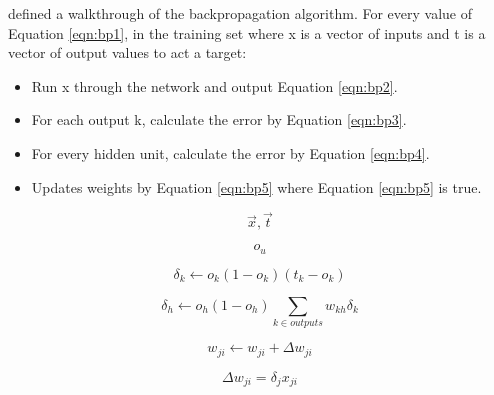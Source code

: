 \parencite{MLANN} defined a walkthrough of the backpropagation algorithm.
For every value of Equation \ref{eqn:bp1}, in the training set where x is a vector of inputs and t is a vector of output values to act a target:
\begin{itemize}
	\item{Run x through the network and output Equation \ref{eqn:bp2}.}
	\item{For each output k, calculate the error by Equation \ref{eqn:bp3}.}
	\item{For every hidden unit, calculate the error by Equation \ref{eqn:bp4}.}
	\item{Updates weights by Equation \ref{eqn:bp5} where Equation \ref{eqn:bp5} is true.}
\end{itemize}

\begin{equation}\label{eqn:bp1}
    \vec{x}, \vec{t}
\end{equation}

\begin{equation}\label{eqn:bp2}
    o_{u}
\end{equation}

\begin{equation}\label{eqn:bp3}
    \delta_{k} \leftarrow o_{k}(1 - o_{k})(t_{k} - o_{k}) 
\end{equation}

\begin{equation}\label{eqn:bp4}
    \delta_{h} \leftarrow o_{h}(1 - o_{h}) \sum_{k \in outputs}   w_{kh}\delta_{k}
\end{equation}

\begin{equation}\label{eqn:bp5}
    w_{ji} \leftarrow w_{ji} + \Delta w_{ji}
\end{equation}

\begin{equation}\label{eqn:bp6}
    \Delta w_{ji} = \delta_{j} x_{ji}
\end{equation}
